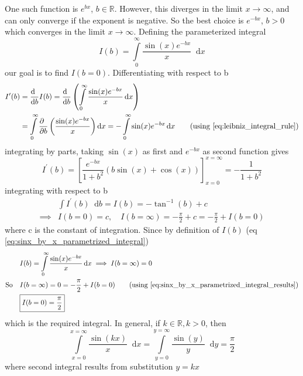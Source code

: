 \documentclass[11pt, a4paper]{article}
\newcommand{\eqrefnp}[1]{\textup{\ref{#1}}}  %
\newcommand{\primed}[1]{#1^{\prime}}
\newcommand{\diff}{\mathop{}\!\mathrm{d}}
\newcommand{\dx}{\diff x}
\newcommand{\dy}{\diff y}
\newcommand{\derv}[1]{\frac{\diff \hfill}{\diff #1}}	%
\newcommand{\dervb}[2]{\derv{#1} \left(#2\right)}  %
\newcommand{\pdiff}{\mathop{}\!\mathrm{\partial}} %
\newcommand{\pderv}[1]{\frac{\pdiff \hfill}{\pdiff #1}}	%
\newcommand{\pdervb}[2]{\pderv{#1} \left(#2\right)}  %
\newcommand{\dint}[2]{\int \limits_{#1}^{#2}}  %
\newcommand{\intzerotoinfty}{\dint{0}{\infty}}	%
\begin{document}
	One such function is $e^{bx}$, $b \in \mathbb{R}$. However, this diverges in the limit $x \to \infty$, and can only converge if the exponent is negative. So the best choice is $e^{-bx}$, $b > 0$ which converges in the limit $x \to \infty$. Defining the parameterized integral
	\begin{equation}\label{eq:sinx_by_x_parametrized_integral}
		I(b) = \intzerotoinfty \frac{\sin(x) e^{-bx}}{x} \dx
	\end{equation}
	our goal is to find $I(b=0)$. Differentiating with respect to b
	\begin{align*}
		\primed{I}(b) & = \derv{b}I(b) = \dervb{b}{\intzerotoinfty \frac{\sin(x) e^{-bx}}{x} \dx} \\
		& = \intzerotoinfty \pdervb{b}{\frac{\sin(x) e^{-bx}}{x}} \dx = -\intzerotoinfty \sin(x) e^{-bx} \dx \tag{using \eqrefnp{eq:leibniz_integral_rule}}
	\end{align*}
	integrating by parts, taking $\sin(x)$ as first and $e^{-bx}$ as second function gives
	\begin{equation*}
		\primed{I}(b) = \left[\frac{e^{-bx}}{1 + b^{2}} \left(b\sin(x) + \cos(x)\right)\right]_{x=0}^{x=\infty} = -\frac{1}{1 + b^{2}}
	\end{equation*}
	integrating with respect to b
	\begin{align}
		& \int \primed{I}(b) \diff b = I(b) = -\tan^{-1}(b) + c \nonumber \\
		\implies & I(b=0) = c, \quad I(b=\infty) = -\frac{\pi}{2} + c = -\frac{\pi}{2} + I(b=0) \label{eq:sinx_by_x_parametrized_integral_results}
	\end{align}
	where c is the constant of integration. Since by definition of $I(b)$ (eq \eqrefnp{eq:sinx_by_x_parametrized_integral})
	\begin{align*}
		& I(b) = \intzerotoinfty \frac{\sin(x) e^{-bx}}{x} \dx \implies I(b=\infty) = 0 \\
		\text{So} \quad & I(b=\infty) = 0 = -\frac{\pi}{2} + I(b=0) \tag{using \eqrefnp{eq:sinx_by_x_parametrized_integral_results}} \\
		& \boxed{I(b=0) = \frac{\pi}{2}}
	\end{align*}
	which is the required integral. In general, if $k \in \mathbb{R}, k > 0$, then
	\begin{equation}\label{eq:int_sinkx_by_x}
		\int \limits_{x=0}^{x=\infty} \frac{\sin(kx)}{x} \dx = \int \limits_{y=0}^{y=\infty} \frac{\sin(y)}{y} \dy = \frac{\pi}{2}
	\end{equation}
	where second integral results from substitution $y=kx$
\end{document}
